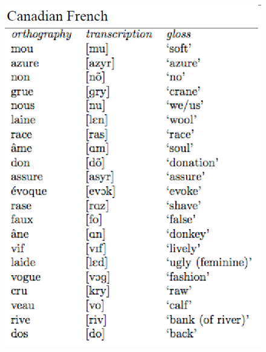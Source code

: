 \documentclass[12pt]{article}
\begin{document}
\begin{figure}[H]
\includegraphics{../images/canadianfrench.png}
\end{figure}

\newpage

\begin{center}
\textbf{{\color{red}{\HUGE END OF EXAM}}}\\

\end{center}
\newpage

\begin{center}
\textbf{{\color{blue}{\HUGE START OF EXAM\\}}}

\textbf{{\color{blue}{\HUGE Student ID: 60467\\}}}

\textbf{{\color{blue}{\HUGE 4:30\\}}}

\end{center}
\newpage
\end{document}
